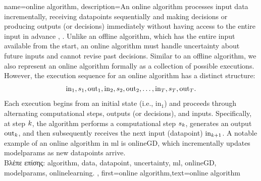 {name={online algorithm},
	description={An online \gls{algorithm} processes input \gls{data} incrementally, 
		receiving \gls{datapoint}s sequentially and making decisions or producing outputs (or decisions) immediately 
		without having access to the entire input in advance \cite{PredictionLearningGames}, \cite{HazanOCO}. 
		Unlike an offline \gls{algorithm}, which has the entire input available from the start, an online \gls{algorithm} 
		must handle \gls{uncertainty} about future inputs and cannot revise past decisions. Similar to an 
		offline \gls{algorithm}, we also represent an online \gls{algorithm} formally as a collection of possible 
		executions. However, the execution sequence for an online \gls{algorithm} has a distinct structure:
		$${\rm in}_{1},s_1,{\rm out}_{1},{\rm in}_{2},s_2,{\rm out}_{2},\ldots,{\rm in}_{T},s_T,{\rm out}_{T}.$$ 
		Each execution begins from an initial state (i.e., \(\text{in}_{1}\)) and proceeds through alternating 
		computational steps, outputs (or decisions), and inputs. Specifically, at step \(k\), 
		the \gls{algorithm} performs a computational step \(s_{k}\), generates an output \(\text{out}_{k}\), 
		and then subsequently receives the next input (\gls{datapoint}) \(\text{in}_{k+1}\). A 
		notable example of an online \gls{algorithm} in \gls{ml} is \gls{onlineGD}, which incrementally 
		updates \gls{modelparams} as new \gls{datapoint}s arrive. 
					\\ 
		\foreignlanguage{greek}{Βλέπε επίσης:} \gls{algorithm}, \gls{data}, \gls{datapoint}, \gls{uncertainty}, \gls{ml}, \gls{onlineGD}, \gls{modelparams}, \gls{onlinelearning}.
	},
	first={online algorithm},text={online algorithm} 
}



